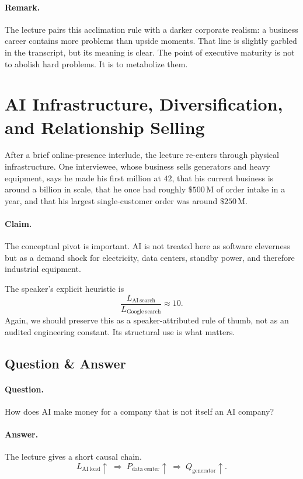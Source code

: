 \paragraph{Remark.} The lecture pairs this acclimation rule with a darker corporate realism: a business career contains more problems than upside moments. That line is slightly garbled in the transcript, but its meaning is clear. The point of executive maturity is not to abolish hard problems. It is to metabolize them.

\section{AI Infrastructure, Diversification, and Relationship Selling}

After a brief online-presence interlude, the lecture re-enters through physical infrastructure. One interviewee, whose business sells generators and heavy equipment, says he made his first million at \(42\), that his current business is around a billion in scale, that he once had roughly \(\$500\,\mathrm{M}\) of order intake in a year, and that his largest single-customer order was around \(\$250\,\mathrm{M}\).

\paragraph{Claim.} The conceptual pivot is important. AI is not treated here as software cleverness but as a demand shock for electricity, data centers, standby power, and therefore industrial equipment.

The speaker's explicit heuristic is
\begin{equation}
\frac{L_{\mathrm{AI\ search}}}{L_{\mathrm{Google\ search}}}\approx 10.
\end{equation}
Again, we should preserve this as a speaker-attributed rule of thumb, not as an audited engineering constant. Its structural use is what matters.

\subsection{Question \& Answer}

\paragraph{Question.} How does AI make money for a company that is not itself an AI company?

\paragraph{Answer.} The lecture gives a short causal chain.
\begin{equation}
L_{\mathrm{AI\ load}}\uparrow \;\Rightarrow\; P_{\mathrm{data\ center}}\uparrow \;\Rightarrow\; Q_{\mathrm{generator}}\uparrow.
\end{equation}

